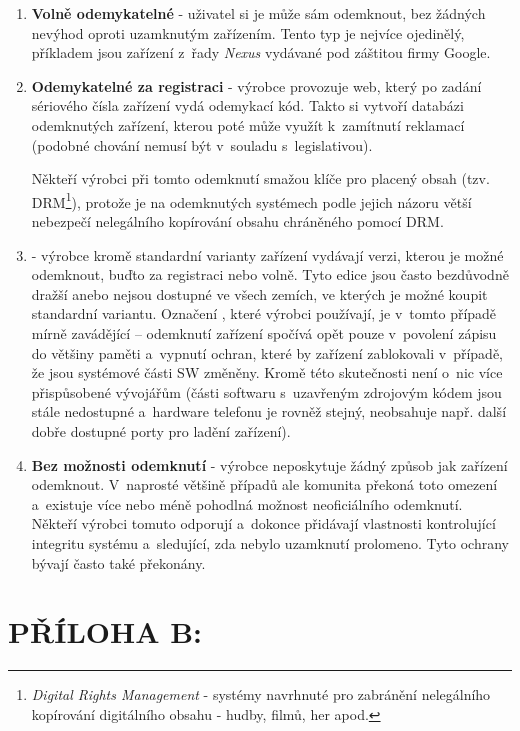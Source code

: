 \documentclass[12pt, a4paper, oneside]{article}
\newcommand{\B}{\textbf} %
\newcommand{\It}{\textit}  %
\begin{document}
\begin{enumerate}
    \item \B{Volně odemykatelné} - uživatel si je může sám odemknout, bez žádných nevýhod oproti uzamknutým zařízením. Tento typ je nejvíce ojedinělý, příkladem jsou zařízení z~řady \It{Nexus} vydávané pod záštitou firmy Google.
    
    \item \B{Odemykatelné za registraci} - výrobce provozuje web, který po zadání sériového čísla zařízení vydá odemykací kód. Takto si vytvoří databázi odemknutých zařízení, kterou poté může využít k~zamítnutí reklamací (podobné chování nemusí být v~souladu s~legislativou).
    
    Někteří výrobci při tomto odemknutí smažou klíče pro placený obsah (tzv. DRM\footnote{\It{Digital Rights Management} - systémy navrhnuté pro zabránění nelegálního kopírování digitálního obsahu - hudby, filmů, her apod.}), protože je na odemknutých systémech podle jejich názoru větší nebezpečí nelegálního kopírování obsahu chráněného pomocí DRM.
    
    \item \B{} - výrobce kromě standardní varianty zařízení vydávají verzi, kterou je možné odemknout, buďto za registraci nebo volně. Tyto edice jsou často bezdůvodně dražší anebo nejsou dostupné ve všech zemích, ve kterých je možné koupit standardní variantu. Označení , které výrobci používají, je v~tomto případě mírně zavádějící -- odemknutí zařízení spočívá opět pouze v~povolení zápisu do většiny paměti a~vypnutí ochran, které by zařízení zablokovali v~případě, že jsou systémové části SW změněny. Kromě této skutečnosti není o~nic více přispůsobené vývojářům (části softwaru s~uzavřeným zdrojovým kódem jsou stále nedostupné a~hardware telefonu je rovněž stejný, neobsahuje např. další dobře dostupné porty pro ladění zařízení).

    \item \B{Bez možnosti odemknutí} - výrobce neposkytuje žádný způsob jak zařízení odemknout. V~naprosté většině případů ale komunita překoná toto omezení a~existuje více nebo méně pohodlná možnost neoficiálního odemknutí. Někteří výrobci tomuto odporují a~dokonce přidávají vlastnosti kontrolující integritu systému a~sledující, zda nebylo uzamknutí prolomeno. Tyto ochrany bývají často také překonány.
    
\end{enumerate}

\newpage
\section*{PŘÍLOHA B:}
\end{document}
